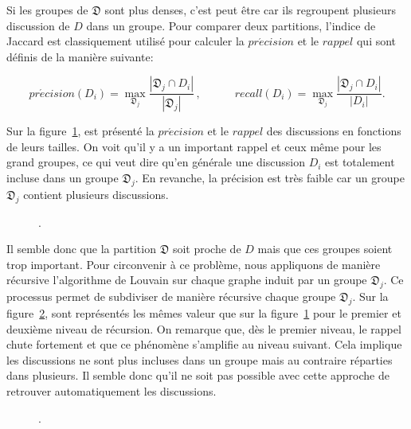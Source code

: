 Si les groupes de $\mathfrak{D}$ sont plus denses, c'est peut être car ils regroupent plusieurs discussion de $D$ dans un groupe.
Pour comparer deux partitions, l'indice de Jaccard est classiquement utilisé pour calculer la $pr\acute{e}cision$ et le $rappel$ qui sont définis de la manière suivante:

\begin{equation*}
pr\acute{e}cision(D_i)= \max_{\mathfrak{D}_j} \frac{|\mathfrak{D}_j \cap D_i|}{|\mathfrak{D}_j|}\,, \quad \qquad
recall(D_i)= \max_{\mathfrak{D}_j} \frac{|\mathfrak{D}_j \cap D_i|}{|D_i|}.
\end{equation*}

Sur la figure~\ref{fig:rec_inclusion_niveau0}, est présenté la $pr\acute{e}cision$ et le $rappel$ des discussions en fonctions de leurs tailles.
On voit qu'il y a un important rappel et ceux même pour les grand groupes, ce qui veut dire qu'en générale une discussion $D_i$ est totalement incluse dans un groupe $\mathfrak{D}_j$.
En revanche, la précision est très faible car un groupe $\mathfrak{D}_j$ contient plusieurs discussions.

\begin{figure}
\centering
\hfill


\caption{.}
\label{fig:rec_inclusion_niveau0}
\end{figure}

Il semble donc que la partition $\mathfrak{D}$ soit proche de $D$ mais que ces groupes soient trop important.
Pour circonvenir à ce problème, nous appliquons de manière récursive l'algorithme de Louvain sur chaque graphe induit par un groupe $\mathfrak{D}_j$.
Ce processus permet de subdiviser de manière récursive chaque groupe $\mathfrak{D}_j$.
Sur la figure~\ref{fig:rec_inclusion}, sont représentés les mêmes valeur que sur la figure~\ref{fig:rec_inclusion_niveau0} pour le premier et deuxième niveau de récursion.
On remarque que, dès le premier niveau, le rappel chute fortement et que ce phénomène s'amplifie au niveau suivant.
Cela implique les discussions ne sont plus incluses dans un groupe mais au contraire réparties dans plusieurs.
Il semble donc qu'il ne soit pas possible avec cette approche de retrouver automatiquement les discussions.

\begin{figure}
\centering
\hfill
\subfloat[ niveau 1]{
}\hfill
\subfloat[niveau 2]{
}\hfill
\caption{.}
\label{fig:rec_inclusion}
\end{figure}

